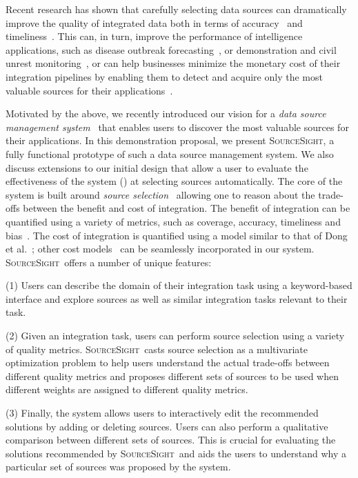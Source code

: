 \documentclass{sig-alternate-05-2015}
\newcommand\system{\textsc{SourceSight}}
\begin{document}
Recent research has shown that carefully selecting data sources can dramatically improve the quality of integrated data both in terms of accuracy~\cite{dong:vldb13} and timeliness~\cite{rekatsinas:2014,rekatsinas:sdm15}. This can, in turn, improve the performance of intelligence applications, such as disease outbreak forecasting~\cite{rekatsinas:sdm15}, or demonstration and civil unrest monitoring~\cite{ramakrishnan2015model}, or can help businesses minimize the monetary cost of their integration pipelines by enabling them to detect and acquire only the most valuable sources for their applications~\cite{dong:vldb13}.

Motivated by the above, we recently introduced our vision for a {\em data source management system}~\cite{rekatsinas:2015} that enables users to discover the most valuable sources for their applications. In this demonstration proposal, we present \system, a fully functional prototype of such a data source management system. We also discuss extensions to our initial design that allow a user to evaluate the effectiveness of the system () at selecting sources automatically. The core of the system is built around {\em source selection}~\cite{dong:vldb13} allowing one to reason about the trade-offs between the benefit and cost of integration. The benefit of integration can be quantified using a variety of metrics, such as coverage, accuracy, timeliness and bias~\cite{rekatsinas:2015}. The cost of integration is quantified using a model similar to that of Dong et al.~\cite{dong:vldb13}; other cost models~\cite{kruse2015estimating} can be seamlessly incorporated in our system. \system~offers a number of unique features:

\vspace{2pt}\noindent (1) Users can describe the domain of their integration task using a keyword-based interface and explore sources as well as similar integration tasks relevant to their task.

\vspace{2pt}\noindent (2) Given an integration task, users can perform source selection using a variety of quality metrics. \system~casts source selection as a multivariate optimization problem to help users understand the actual trade-offs between different quality metrics and proposes different sets of sources to be used when different weights are assigned to different quality metrics. 

\vspace{2pt}\noindent (3) Finally, the system allows users to interactively edit the recommended solutions by adding or deleting sources. Users can also perform a qualitative comparison between different sets of sources. This is crucial for evaluating the solutions recommended by \system~and aids the users to understand why a particular set of sources was proposed by the system.
\end{document}
